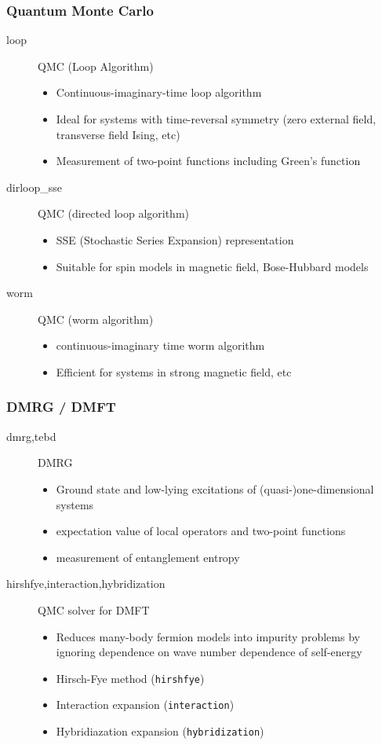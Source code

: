 \begin{frame}[t,fragile]
  \frametitle{Quantum Monte Carlo}
  \begin{description}
  \item[loop] QMC (Loop Algorithm)
    \begin{itemize}
      \item Continuous-imaginary-time loop algorithm
      \item Ideal for systems with time-reversal symmetry (zero external field, transverse field Ising, etc)
      \item Measurement of two-point functions including Green's function
    \end{itemize}
  \item[dirloop\_sse] QMC (directed loop algorithm)
    \begin{itemize}
      \item SSE (Stochastic Series Expansion) representation
      \item Suitable for spin models in magnetic field, Bose-Hubbard models
    \end{itemize}
  \item[worm] QMC (worm algorithm)
    \begin{itemize}
      \item continuous-imaginary time worm algorithm
      \item Efficient for systems in strong magnetic field, etc
    \end{itemize}
  \end{description}
\end{frame}

\begin{frame}[t,fragile]
  \frametitle{DMRG / DMFT}
  \begin{description}
  \item[dmrg,tebd] DMRG
    \begin{itemize}
      \item Ground state and low-lying excitations of (quasi-)one-dimensional systems
      \item expectation value of local operators and two-point functions
      \item measurement of entanglement entropy
    \end{itemize}
  \item[hirshfye,interaction,hybridization] QMC solver for DMFT
    \begin{itemize}
      \item Reduces many-body fermion models into impurity problems by ignoring dependence on wave number dependence of self-energy
      \item Hirsch-Fye method ({\tt hirshfye})
      \item Interaction expansion ({\tt interaction})
      \item Hybridiazation expansion ({\tt hybridization})
    \end{itemize}
  \end{description}
\end{frame}


